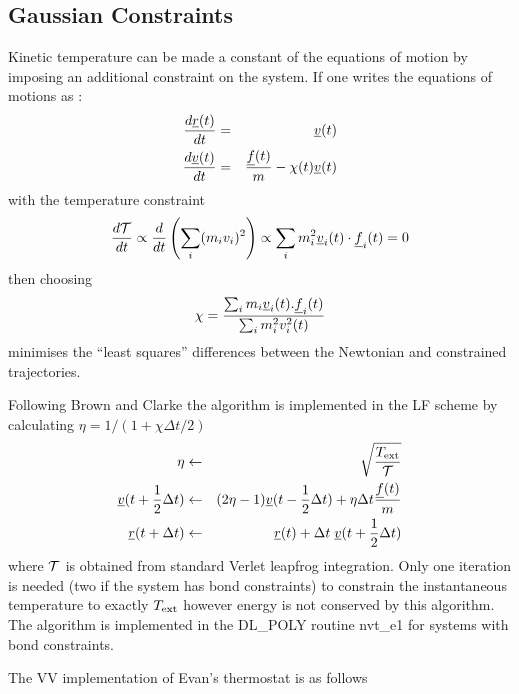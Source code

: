 \subsection{Gaussian Constraints}

Kinetic temperature can be made a constant of the equations of motion
by imposing an additional constraint on the system. If one writes the
equations of motions as :
\begin{eqnarray}
{d \mbox{$\underline{r}$}(t) \over d t}& =& \mbox{$\underline{v}$}(t)\nonumber \\
{d \mbox{$\underline{v}$}(t) \over d t}& =& {\mbox{$\underline{f}$}(t)\over m} - \chi(t) \mbox{$\underline{v}$}(t)\\
\end{eqnarray}
with the temperature constraint
\begin{equation}
{d{\cal T}\over dt} \propto {d \over dt}\left(\sum_i (m_i v_i)^2
\right) \propto \sum_i m_i^2
\mbox{$\underline{v}$}_i(t)\cdot\mbox{$\underline{f}$}_i(t) = 0
\end{equation}
then choosing
\begin{equation}
\chi = {\sum_i m_i \mbox{$\underline{v}$}_i(t).\mbox{$\underline{f}$}_i(t) \over \sum_i m_i^2 v_i^2(t)}
\end{equation}
minimises the ``least squares'' differences between the Newtonian and
constrained trajectories.  

Following Brown and Clarke \cite{brown-84a} the algorithm is
implemented in the LF scheme by calculating $\eta = 1/(1+ \chi\Delta t/2)$
\begin{eqnarray}
\eta&\leftarrow& \sqrt{{T_{\rm ext}\over {\cal T}}}\nonumber\\
\mbox{$\underline{v}$}(t+{1\over 2}\Delta t)& \leftarrow& (2\eta-1) \mbox{$\underline{v}$}(t-{1\over2}\Delta t) + \eta\Delta t {\mbox{$\underline{f}$}(t)\over m}
\nonumber\\
\mbox{$\underline{r}$}(t+\Delta t) &\leftarrow& \mbox{$\underline{r}$}(t) + \Delta t\; \mbox{$\underline{v}$}(t+{1\over 2}\Delta t)
\end{eqnarray}
where ${\cal T}$ is obtained from standard
Verlet leapfrog integration.  Only one
iteration is needed (two if the system has bond constraints) to
constrain the instantaneous temperature to exactly $T_{\rm ext}$
however energy is not conserved by this algorithm.  The algorithm is
implemented in the DL\_POLY routine {\sc nvt\_e1} for systems with
bond constraints.

The VV implementation of Evan's thermostat is as follows

